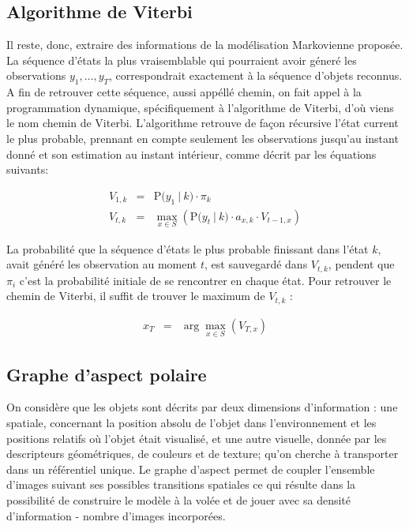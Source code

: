 
\subsection{Algorithme de Viterbi}

Il reste, donc, extraire des informations de la modélisation Markovienne proposée.
La séquence d'états la plus vraisemblable qui pourraient avoir géneré
les observations  $y_1,\dots, y_T$, correspondrait exactement à la séquence d'objets reconnus.
A fin de retrouver cette séquence, aussi appéllé chemin, on fait 
appel à la programmation dynamique, spécifiquement à l'algorithme de Viterbi, d'où viens le nom chemin de Viterbi.
L'algorithme retrouve de façon récursive l'état current le plus probable, 
prennant en compte seulement les observations jusqu'au instant donné et son
estimation au instant intérieur, comme décrit par les équations suivants:

\begin{equation*}
  \begin{array}{rcl}
    V_{1,k} &=& \mathrm{P}\big( y_1 \ | \ k \big) \cdot \pi_k \\
    V_{t,k} &=& \max_{x \in S} \left(  \mathrm{P}\big( y_t \ | \ k \big) \cdot a_{x,k} \cdot V_{t-1,x}\right)
  \end{array}
\end{equation*}

La probabilité que la séquence d'états le plus probable finissant dans l'état $k$, avait généré les observation au moment $t$, est sauvegardé dans $V_{t,k}$, pendent que $\pi_i$ c'est la probabilité initiale de se rencontrer en chaque état. Pour retrouver le chemin de Viterbi, il suffit de trouver le maximum de $V_{t,k}$ :

\begin{equation*}
  \begin{array}{rcl}
    x_T &=& \arg\max_{x \in S} (V_{T,x})
  \end{array}
\end{equation*}

\subsection {Graphe d'aspect polaire}

On considère que les objets sont décrits par deux dimensions
d'information : une spatiale, concernant la position absolu de l'objet
dans l'environnement et les positions relatifs où l'objet était
visualisé, et une autre visuelle, donnée par les descripteurs
géométriques, de couleurs et de texture; qu'on cherche à transporter
dans un référentiel unique. Le graphe d'aspect permet de coupler
l'ensemble d'images suivant ses possibles transitions spatiales ce qui
résulte dans la possibilité de construire le modèle à la volée et de
jouer avec sa densité d'information - nombre d'images incorporées.

